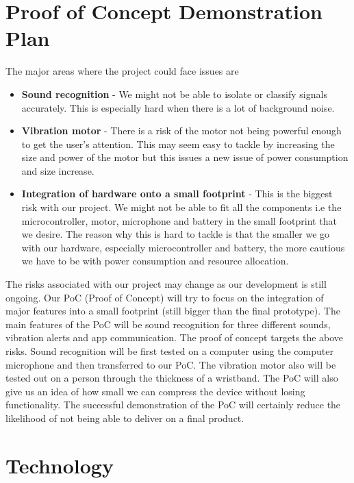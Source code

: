 \documentclass{article}
\begin{document}
\section{Proof of Concept Demonstration Plan}

The major areas where the project could face issues are 
\begin{itemize}
	\item \textbf{Sound recognition} - We might not be able to isolate or classify signals accurately. This is especially hard when there is a lot of background noise. 
	\item \textbf{Vibration motor} - There is a risk of the motor not being powerful enough to get the user’s attention. This may seem easy to tackle by increasing the size and power of the motor but this issues a new issue of power consumption and size increase.
	\item \textbf{Integration of hardware onto a small footprint} - This is the biggest risk with our project. We might not be able to fit all the components i.e the microcontroller, motor, microphone and battery in the small footprint that we desire. The reason why this is hard to tackle is that the smaller we go with our hardware, especially microcontroller and battery, the more cautious we have to be with power consumption and resource allocation. 
\end{itemize} 
The risks associated with our project may change as our development is still ongoing. 
Our PoC (Proof of Concept) will try to focus on the integration of major features into a small footprint (still bigger than the final prototype). The main features of the PoC will be sound recognition for three different sounds, vibration alerts and app communication. The proof of concept targets the above risks. Sound recognition will be first tested on a computer using the computer microphone and then transferred to our PoC. The vibration motor also will be tested out on a person through the thickness of a wristband. The PoC will also give us an idea of how small we can compress the device without losing functionality. The successful demonstration of the PoC will certainly reduce the likelihood of not being able to deliver on a final product.


\section{Technology}
\end{document}
